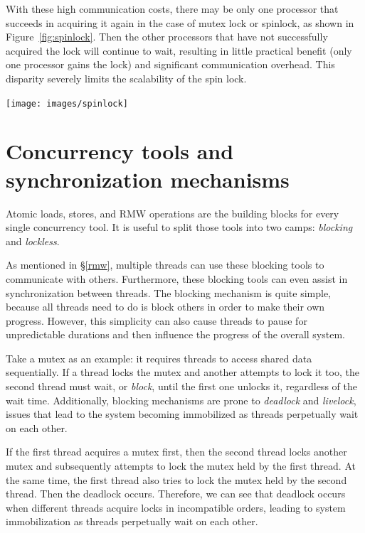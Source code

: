 \documentclass[fontsize=10pt, oneside]{scrartcl}
\newcommand{\fig}[1]{Figure~\ref{#1}}
\newcommand{\introduce}[1]{\textit{#1}}
\newcommand{\secref}[1]{\hyperref[#1]{\textsc{\S}\ref*{#1}}}
\begin{document}
With these high communication costs, there may be only one processor that succeeds in acquiring it again in the case of mutex lock or spinlock, as shown in \fig{fig:spinlock}. 
Then the other processors that have not successfully acquired the lock will continue to wait, 
resulting in little practical benefit (only one processor gains the lock) and significant communication overhead. 
This disparity severely limits the scalability of the spin lock.

\texttt{[image: images/spinlock]}
\label{fig:spinlock}

\section{Concurrency tools and synchronization mechanisms}
\label{concurrency-tool}
Atomic loads, stores, and \textsc{RMW} operations are the building blocks for every single concurrency tool.
It is useful to split those tools into two camps:
\introduce{blocking} and \introduce{lockless}.

As mentioned in \secref{rmw}, multiple threads can use these blocking tools to communicate with others. 
Furthermore, these blocking tools can even assist in synchronization between threads. 
The blocking mechanism is quite simple, 
because all threads need to do is block others in order to make their own progress. 
However, this simplicity can also cause threads to pause for unpredictable durations and then influence the progress of the overall system.

Take a mutex as an example:
it requires threads to access shared data sequentially.
If a thread locks the mutex and another attempts to lock it too,
the second thread must wait, or \introduce{block},
until the first one unlocks it, regardless of the wait time.
Additionally, blocking mechanisms are prone to \introduce{deadlock} and \introduce{livelock},
issues that lead to the system becoming immobilized as threads perpetually wait on each other.

If the first thread acquires a mutex first, 
then the second thread locks another mutex and subsequently attempts to lock the mutex held by the first thread. 
At the same time, the first thread also tries to lock the mutex held by the second thread.
Then the deadlock occurs.
Therefore, we can see that deadlock occurs when different threads acquire locks in incompatible orders, 
leading to system immobilization as threads perpetually wait on each other. 
\end{document}
